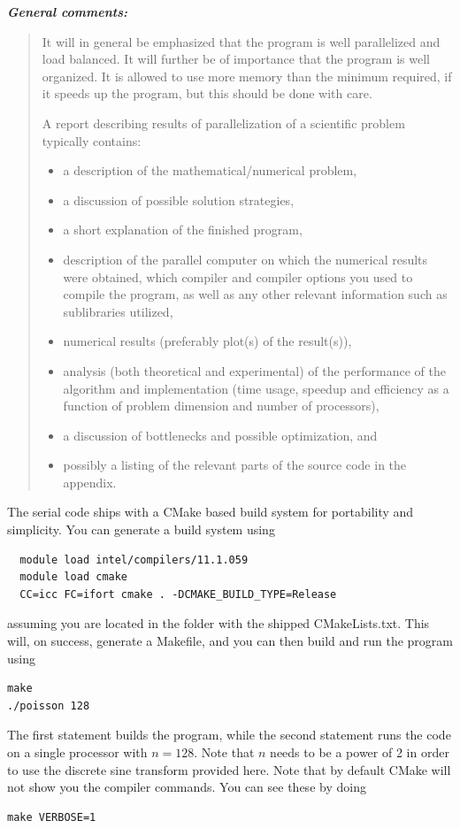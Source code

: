 \documentclass[11pt]{article}
\begin{document}
\newpage
\textbf{\textit{General comments:}}
\begin{quote}
    It will in general be emphasized that the program is well
    parallelized and load balanced. It will further be of importance
    that the program is well organized. It is allowed to use more
    memory than the minimum required, if it speeds up the program,
    but this should be done with care.

    A report describing results of parallelization of a scientific
    problem typically contains:
    \begin{itemize}
    \item a description of the mathematical/numerical problem,
    \item a discussion of possible solution strategies,
    \item a short explanation of the finished program,
    \item description of the parallel computer on which the numerical
        results were obtained, which compiler and compiler options
        you used to compile the program, as well as any other relevant
        information such as sublibraries utilized,
    \item numerical results (preferably plot(s) of the
        result(s)),
    \item analysis (both theoretical and experimental) of the
        performance of the algorithm and implementation (time usage,
        speedup and efficiency as a function of problem dimension and
        number of processors),
    \item a discussion of bottlenecks and possible
        optimization, and
    \item possibly a listing of the relevant parts of the source code
        in the appendix.
    \end{itemize}
\end{quote}


The serial code ships with a CMake based build system for portability
and simplicity. You can generate a build system using
\begin{verbatim}
  module load intel/compilers/11.1.059
  module load cmake
  CC=icc FC=ifort cmake . -DCMAKE_BUILD_TYPE=Release
\end{verbatim}
assuming you are located in the folder with the shipped CMakeLists.txt.
This will, on success, generate a Makefile, and you can then build
and run the program using
\begin{verbatim}
make
./poisson 128
\end{verbatim}
The first statement builds the program, while the second statement
runs the code on a single processor with $n=128$.
Note that $n$ needs to be a power of 2 in order to use 
the discrete sine transform provided here. Note that by default CMake
will not show you the compiler commands. You can see these by doing
\begin{verbatim}
make VERBOSE=1
\end{verbatim}
\end{document}
